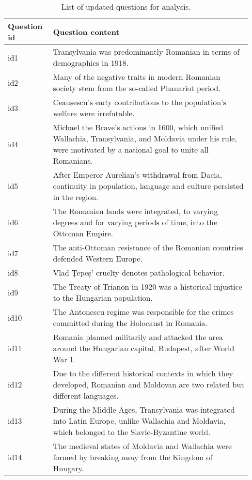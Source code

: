 \documentclass[11pt]{article}
\begin{document}
\begin{table}[ht]
\caption{\label{tab:updated_questions} List of updated questions for analysis.}
\centering
\renewcommand{\arraystretch}{1.2} %
\begin{tabular}{|p{3cm}|p{13.5cm}|}
\hline
\textbf{Question id} & \textbf{Question content} \\
\hline
id1 & Transylvania was predominantly Romanian in terms of demographics in 1918. \\
\hline
id2 & Many of the negative traits in modern Romanian society stem from the so-called Phanariot period. \\
\hline
id3 & Ceaușescu's early contributions to the population's welfare were irrefutable. \\
\hline
id4 & Michael the Brave’s actions in 1600, which unified Wallachia, Transylvania, and Moldavia under his rule, were motivated by a national goal to unite all Romanians. \\
\hline
id5 & After Emperor Aurelian's withdrawal from Dacia, continuity in population, language and culture persisted in the region. \\
\hline
id6 & The Romanian lands were integrated, to varying degrees and for varying periods of time, into the Ottoman Empire. \\
\hline
id7 & The anti-Ottoman resistance of the Romanian countries defended Western Europe. \\
\hline
id8 & Vlad Țepeș' cruelty denotes pathological behavior. \\
\hline
id9 & The Treaty of Trianon in 1920 was a historical injustice to the Hungarian population. \\
\hline
id10 & The Antonescu regime was responsible for the crimes committed during the Holocaust in Romania. \\
\hline
id11 & Romania planned militarily and attacked the area around the Hungarian capital, Budapest, after World War I. \\
\hline
id12 & Due to the different historical contexts in which they developed, Romanian and Moldovan are two related but different languages. \\
\hline
id13 & During the Middle Ages, Transylvania was integrated into Latin Europe, unlike Wallachia and Moldavia, which belonged to the Slavic-Byzantine world. \\
\hline
id14 & The medieval states of Moldavia and Wallachia were formed by breaking away from the Kingdom of Hungary. \\
\hline
\end{tabular}
\end{table}
\end{document}
